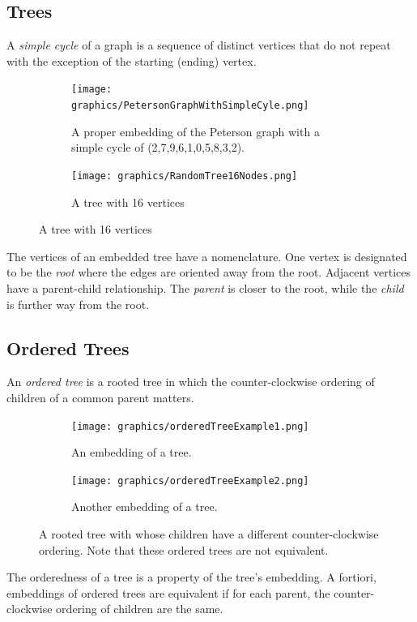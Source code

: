 \subsection{Trees}
A \textit{simple  cycle} of a graph is a sequence of distinct vertices that do not repeat 
with the exception 
of the starting (ending) vertex. 
\begin{figure}[h]
\begin{center}
  \begin{subfigure}[b]{0.49\textwidth}
    \texttt{[image: graphics/PetersonGraphWithSimpleCyle.png]}
    \caption{A proper embedding of the Peterson graph with a simple cycle of 
    (2,7,9,6,1,0,5,8,3,2).}\label{fig:ch1-graph-2}
  \end{subfigure}
  \begin{subfigure}[b]{0.49\textwidth}
    \texttt{[image: graphics/RandomTree16Nodes.png]}
    \caption{A tree with 16 vertices}\label{fig:ch1-graph-3}
  \end{subfigure}
\end{center}
\end{figure}
The vertices of an embedded tree have a nomenclature.  One vertex is designated to be the 
\textit{root} where the edges are oriented away from the root.  Adjacent vertices have a 
parent-child relationship.  The \textit{parent} is closer to the root, while the \textit{child} is 
further way from the root.
\subsection{Ordered Trees}
An \textit{ordered tree} is a rooted tree in which the counter-clockwise ordering of children of a 
common parent matters.
\begin{figure}[h]
\begin{center}
  \begin{subfigure}[b]{0.4\textwidth}
    \texttt{[image: graphics/orderedTreeExample1.png]}
    \caption{An embedding of a tree.}\label{fig:ch1-graph-4}
  \end{subfigure}
  \begin{subfigure}[b]{0.4\textwidth}
    \texttt{[image: graphics/orderedTreeExample2.png]}
    \caption{Another embedding of a tree.}\label{fig:ch1-graph-5}
  \end{subfigure}
  \caption{A rooted tree with whose children have a different counter-clockwise 
ordering.  Note that these ordered trees are not equivalent.}\label{fig:ch1-graph-6}
\end{center}
\end{figure}
The orderedness of a tree is a property of the tree's embedding.  A fortiori, embeddings of ordered 
trees are equivalent if for each parent, the counter-clockwise ordering of children are the same.
